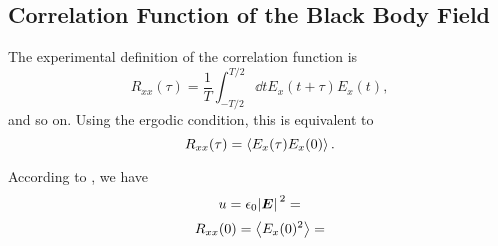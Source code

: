 \documentclass[hyperref, a4paper]{article}
\begin{document}
\subsection{Correlation Function of the Black Body Field}

The experimental definition of the correlation function is 
\begin{equation}
    R_{xx}(\tau) = \frac{1}{T} \int_{-T/2}^{T/2} \dd{t} E_x(t+\tau) E_x(t),
\end{equation}
and so on. 
Using the ergodic condition, this is equivalent to 
\begin{equation}
    R_{xx} (\tau) = \expval{E_x(\tau) E_x(0)}.
\end{equation}

According to , 
we have 
\begin{equation}
    u = \epsilon_0 \abs*{\vb*{E}}^2 = 
\end{equation}
\begin{equation}
    R_{xx}(0) = \expval{E_x(0)^2} = 
\end{equation}
\end{document}
